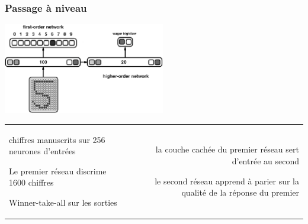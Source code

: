 \documentclass[11pt]{beamer}
\newenvironment{noitemize}
{\begin{list}{}{%
\setlength{\labelwidth}{0em}%
\setlength{\labelsep}{2pt}%
\setlength{\leftmargin}{0pt}%
\renewcommand{\makelabel}{\small\color{cloneBlue}{\textbullet}}}}%
{\end{list}}
\newenvironment{minusitemize}
{\begin{list}{}{%
\setlength{\labelwidth}{0em}%
\setlength{\labelsep}{2pt}%
\setlength{\leftmargin}{-15pt}%
\renewcommand{\makelabel}{\small\color{cloneBlue}{\textbullet}}}}%
{\end{list}}
\begin{document}
\begin{frame}
  \frametitle{Passage à niveau}
  \begin{center}
  \includegraphics[height=150px]{base.png}
  \end{center}

  \begin{center}
  \begin{tabular}{lr}
  \begin{minipage}{150px}
    
    \footnotesize\begin{minusitemize}
     \item chiffres manuscrits sur 256 neurones d'entrées
     \item Le premier réseau discrime 1600 chiffres
     \item Winner-take-all sur les sorties
    \end{minusitemize}

    \end{minipage}
    &
    \begin{minipage}{170px}
    \footnotesize\begin{noitemize}
     \item la couche cachée du premier réseau sert d'entrée au second
     \item le second réseau apprend à parier sur la qualité de la réponse du premier
    \end{noitemize}
    
    \end{minipage}
  \end{tabular}

  \end{center}
  
\end{frame}
\end{document}
